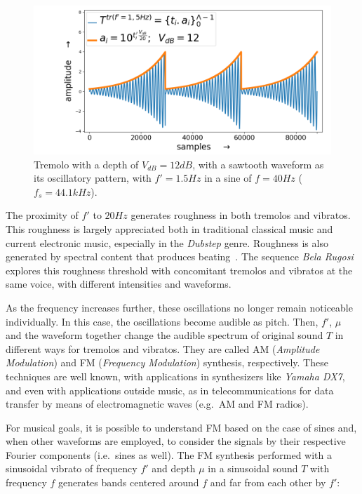 \begin{figure}
     \centering
         \includegraphics[width=\textwidth]{figures/tremolo_}
     \caption{Tremolo with a depth of $V_{dB}=12dB$, with a sawtooth waveform as its oscillatory pattern, with $f'=1.5Hz$ in a sine of $f=40Hz$ ($f_s=44.1kHz$).}
         \label{fig:tremolo}
\end{figure}

The proximity of $f'$ to $20Hz$ generates roughness in both tremolos and vibratos. This roughness is largely appreciated both in traditional classical music and current electronic music, especially in the \emph{Dubstep} genre. Roughness is also generated by spectral content that produces beating~\cite{Porres,porres2009}. The sequence \emph{Bela Rugosi} explores this roughness threshold with concomitant tremolos and vibratos at the same voice, with different intensities and waveforms.~\cite{MASSA}

As the frequency increases further, these oscillations no longer remain noticeable individually.
In this case, the oscillations become audible as pitch.
Then, $f'$, $\mu$ and the waveform together change the audible spectrum of original sound $T$ in different ways for tremolos and vibratos. They are called AM (\emph{Amplitude Modulation}) and FM (\emph{Frequency Modulation}) synthesis,
respectively. These techniques are well known, with applications in
synthesizers like \emph{Yamaha DX7}, and even with applications outside music, as in telecommunications for data transfer by means of electromagnetic waves (e.g.\ AM and FM radios).

For musical goals, it is possible to understand FM based on the
case of sines and, when other waveforms are employed, to consider the signals by their respective Fourier components (i.e.\ sines as well).
The FM synthesis performed with a sinusoidal vibrato of frequency $f'$ and depth $\mu$ in a sinusoidal sound $T$ with frequency $f$ generates bands centered around $f$ and far from each other by $f'$:

